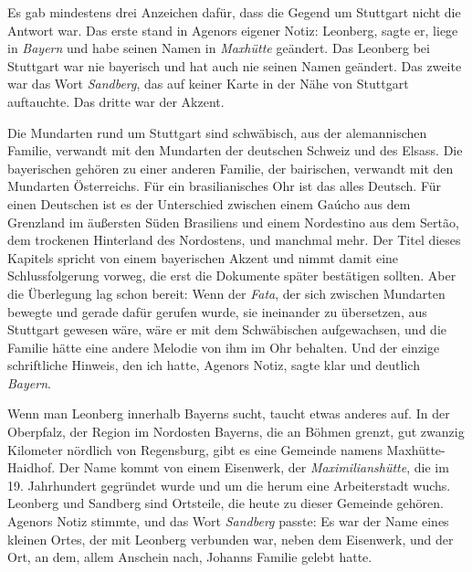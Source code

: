 \documentclass[
  ngerman,
  11pt,
  openany]{book}
\begin{document}
Es gab mindestens drei Anzeichen dafür, dass die Gegend um Stuttgart
nicht die Antwort war. Das erste stand in Agenors eigener Notiz:
Leonberg, sagte er, liege in \emph{Bayern} und habe seinen Namen in
\emph{Maxhütte} geändert. Das Leonberg bei Stuttgart war nie bayerisch
und hat auch nie seinen Namen geändert. Das zweite war das Wort
\emph{Sandberg}, das auf keiner Karte in der Nähe von Stuttgart
auftauchte. Das dritte war der Akzent.

Die Mundarten rund um Stuttgart sind schwäbisch, aus der alemannischen
Familie, verwandt mit den Mundarten der deutschen Schweiz und des
Elsass. Die bayerischen gehören zu einer anderen Familie, der
bairischen, verwandt mit den Mundarten Österreichs. Für ein
brasilianisches Ohr ist das alles Deutsch. Für einen Deutschen ist es
der Unterschied zwischen einem Gaúcho aus dem Grenzland im äußersten
Süden Brasiliens und einem Nordestino aus dem Sertão, dem trockenen
Hinterland des Nordostens, und manchmal mehr. Der Titel dieses Kapitels
spricht von einem bayerischen Akzent und nimmt damit eine
Schlussfolgerung vorweg, die erst die Dokumente später bestätigen
sollten. Aber die Überlegung lag schon bereit: Wenn der \emph{Fata}, der
sich zwischen Mundarten bewegte und gerade dafür gerufen wurde, sie
ineinander zu übersetzen, aus Stuttgart gewesen wäre, wäre er mit dem
Schwäbischen aufgewachsen, und die Familie hätte eine andere Melodie von
ihm im Ohr behalten. Und der einzige schriftliche Hinweis, den ich
hatte, Agenors Notiz, sagte klar und deutlich \emph{Bayern}.

Wenn man Leonberg innerhalb Bayerns sucht, taucht etwas anderes auf. In
der Oberpfalz, der Region im Nordosten Bayerns, die an Böhmen grenzt,
gut zwanzig Kilometer nördlich von Regensburg, gibt es eine Gemeinde
namens Maxhütte-Haidhof. Der Name kommt von einem Eisenwerk, der
\emph{Maximilianshütte}, die im 19. Jahrhundert gegründet wurde und um
die herum eine Arbeiterstadt wuchs. Leonberg und Sandberg sind
Ortsteile, die heute zu dieser Gemeinde gehören. Agenors Notiz stimmte,
und das Wort \emph{Sandberg} passte: Es war der Name eines kleinen
Ortes, der mit Leonberg verbunden war, neben dem Eisenwerk, und der Ort,
an dem, allem Anschein nach, Johanns Familie gelebt hatte.
\end{document}
